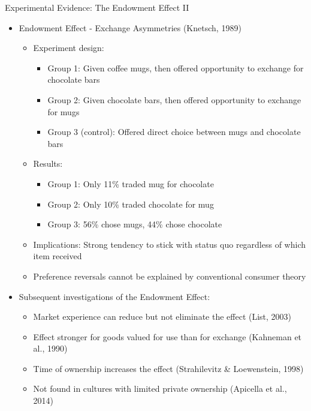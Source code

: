 \documentclass[10pt,handout]{beamer}
\begin{document}
\begin{frame}{Experimental Evidence: The Endowment Effect II}
  \begin{itemize}[<+->]
    \item Endowment Effect - Exchange Asymmetries (Knetsch, 1989)
      \begin{itemize}
        \item Experiment design:
          \begin{itemize}
            \item Group 1: Given coffee mugs, then offered opportunity to exchange for chocolate bars
            \item Group 2: Given chocolate bars, then offered opportunity to exchange for mugs
            \item Group 3 (control): Offered direct choice between mugs and chocolate bars
          \end{itemize}
        \item Results:
          \begin{itemize}
            \item Group 1: Only 11\% traded mug for chocolate
            \item Group 2: Only 10\% traded chocolate for mug
            \item Group 3: 56\% chose mugs, 44\% chose chocolate
          \end{itemize}
        \item Implications: Strong tendency to stick with status quo regardless of which item received
        \item Preference reversals cannot be explained by conventional consumer theory
      \end{itemize}
    \item Subsequent investigations of the Endowment Effect:
      \begin{itemize}
        \item Market experience can reduce but not eliminate the effect (List, 2003)
        \item Effect stronger for goods valued for use than for exchange (Kahneman et al., 1990)
        \item Time of ownership increases the effect (Strahilevitz \& Loewenstein, 1998)
        \item Not found in cultures with limited private ownership (Apicella et al., 2014)
      \end{itemize}
  \end{itemize}
\end{frame}
\end{document}
